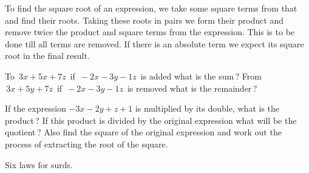 \documentclass[]{article}
\begin{document}
{{{\begin{quote}  {
}  \end{quote}

{To find the square root of an expression, we take some square terms
from that and find their roots. Taking these roots in pairs we form
their product and remove twice the product and square terms from the
expression. This is to be done till all terms are removed. If there is
an absolute term we expect its square root in the final result.}

\begin{quote}  {
}  \end{quote}

{To $\,3x + 5x +7z$\, if $\,-2x-3y-1z$\, is added what is the sum\,? From $\,3x + 5y +7z$\, if $\,-2x-3y-1z$\, is removed what is the remainder\,?}

\newpage
\large

\begin{quote}  {
}  \end{quote}

{If the expression $-3x-2y+z+1$ is multiplied by its double, what is the
product\,? If this product is divided by the original expression what will
be the quotient\,? Also find the square of the original expression and
work out the process of extracting the root of the square.}

\vspace{20pt}
\begin{center}
\begin{Large}
 \label{kar}
{}
Six laws for surds.
\end{Large}
\end{center}
\vspace{10pt}

}}}
\end{document}
